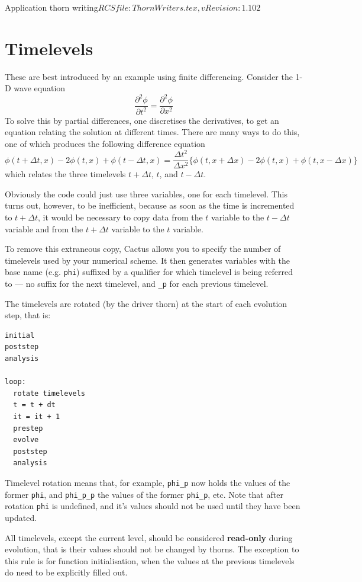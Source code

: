 \begin{cactuspart}{2}{Application thorn writing}{$RCSfile: ThornWriters.tex,v $}{$Revision: 1.102 $}
\section{Timelevels}

These are best introduced by an example using finite differencing.
Consider the 1-D wave equation
\begin{equation}
\frac{\partial^2 \phi}{\partial t^2} = \frac{\partial^2 \phi}{\partial x^2}
\end{equation}
To solve this by partial differences, one discretises the derivatives, to get
an equation relating the solution at different times.  There are many ways
to do this, one of which produces the following difference equation
\begin{equation}
\label{equation:difference}
\phi(t+\Delta t,x) -2\phi(t,x) +\phi(t-\Delta t,x) = \frac{\Delta t^2}{\Delta x^2} \lbrace{\phi(t,x+\Delta x) -2\phi(t,x) +\phi(t,x-\Delta x)}\rbrace
\end{equation}
which relates the three timelevels $t+\Delta t$, $t$, and $t-\Delta t$.

Obviously the code could just use three variables, one for each timelevel.
This turns out, however, to be inefficient, because as soon as the time is
incremented to $t+\Delta t$, it would be necessary to copy data from the
$t$ variable to the $t-\Delta t$ variable and from the $t+\Delta t$ variable
to the $t$ variable.

To remove this extraneous copy, Cactus allows you to specify the number
of timelevels used by your numerical scheme.  It then generates variables
with the base name (e.g. {\tt phi}) suffixed by a qualifier for
which timelevel is being referred to --- no suffix for the
next timelevel, and {\tt \_p} for each previous timelevel.

The timelevels are rotated (by the driver thorn) at the start
of each evolution step, that is:
\begin{verbatim}
initial
poststep
analysis

loop:
  rotate timelevels
  t = t + dt
  it = it + 1
  prestep
  evolve
  poststep
  analysis
\end{verbatim}

Timelevel rotation means that, for example,
{\tt phi\_p} now holds the values of the former {\tt phi},
and {\tt phi\_p\_p} the values of the former {\tt phi\_p}, etc.
Note that after rotation {\tt phi} is  undefined, and it's values should
not be used until they have been updated.

All timelevels, except the current level, should be considered {\bf read-only} during evolution, that is their values should not be changed by thorns.
The exception to this rule is for function initialisation, when the
values at the previous timelevels do need to be explicitly filled out.




\end{cactuspart}
